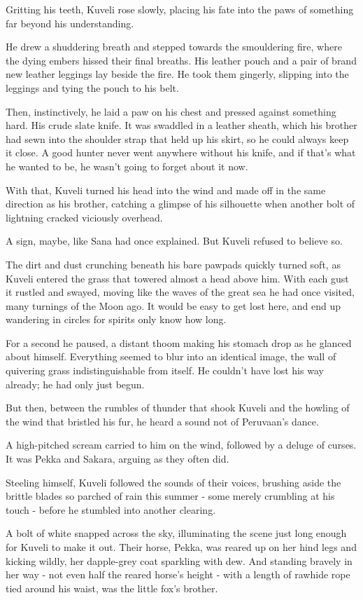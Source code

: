 Gritting his teeth, Kuveli rose slowly, placing his fate into the paws of something far beyond his understanding.

He drew a shuddering breath and stepped towards the smouldering fire, where the dying embers hissed their final breaths. His leather pouch and a pair of brand new leather leggings lay beside the fire. He took them gingerly, slipping into the leggings and tying the pouch to his belt.

Then, instinctively, he laid a paw on his chest and pressed against something hard. His crude slate knife. It was swaddled in a leather sheath, which his brother had sewn into the shoulder strap that held up his skirt, so he could always keep it close. A good hunter never went anywhere without his knife, and if that's what he wanted to be, he wasn't going to forget about it now.

With that, Kuveli turned his head into the wind and made off in the same direction as his brother, catching a glimpse of his silhouette when another bolt of lightning cracked viciously overhead.

A sign, maybe, like Sana had once explained. But Kuveli refused to believe so.

The dirt and dust crunching beneath his bare pawpads quickly turned soft, as Kuveli entered the grass that towered almost a head above him. With each gust it rustled and swayed, moving like the waves of the great sea he had once visited, many turnings of the Moon ago. It would be easy to get lost here, and end up wandering in circles for spirits only know how long.

For a second he paused, a distant thoom making his stomach drop as he glanced about himself. Everything seemed to blur into an identical image, the wall of quivering grass indistinguishable from itself. He couldn't have lost his way already; he had only just begun.

But then, between the rumbles of thunder that shook Kuveli and the howling of the wind that bristled his fur, he heard a sound not of Peruvaan's dance.

A high-pitched scream carried to him on the wind, followed by a deluge of curses. It was Pekka and Sakara, arguing as they often did.

Steeling himself, Kuveli followed the sounds of their voices, brushing aside the brittle blades so parched of rain this summer - some merely crumbling at his touch - before he stumbled into another clearing.

A bolt of white snapped across the sky, illuminating the scene just long enough for Kuveli to make it out. Their horse, Pekka, was reared up on her hind legs and kicking wildly, her dapple-grey coat sparkling with dew. And standing bravely in her way - not even half the reared horse's height - with a length of rawhide rope tied around his waist, was the little fox's brother.

